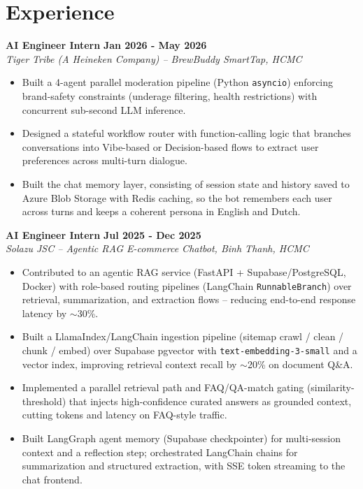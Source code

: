 \documentclass[a4paper,10pt]{article}
\begin{document}
\section{Experience}

\textbf{AI Engineer Intern} \hfill \textbf{Jan 2026 - May 2026} \\
\textit{Tiger Tribe (A Heineken Company) -- BrewBuddy SmartTap, HCMC} \\
\vspace{-0.3em}
\begin{itemize}[leftmargin=1.2em, itemsep=0.05em, parsep=0pt, topsep=0pt]
    \item Built a 4-agent parallel moderation pipeline (Python \texttt{asyncio}) enforcing brand-safety constraints (underage filtering, health restrictions) with concurrent sub-second LLM inference.
    \item Designed a stateful workflow router with function-calling logic that branches conversations into Vibe-based or Decision-based flows to extract user preferences across multi-turn dialogue.
    \item Built the chat memory layer, consisting of session state and history saved to Azure Blob Storage with Redis caching, so the bot remembers each user across turns and keeps a coherent persona in English and Dutch.
\end{itemize}

\vspace{0.3em}
\noindent\textbf{AI Engineer Intern} \hfill \textbf{Jul 2025 - Dec 2025} \\
\textit{Solazu JSC -- Agentic RAG E-commerce Chatbot, Binh Thanh, HCMC} \\
\vspace{-0.3em}
\begin{itemize}[leftmargin=1.2em, itemsep=0.05em, parsep=0pt, topsep=0pt]
    \item Contributed to an agentic RAG service (FastAPI + Supabase/PostgreSQL, Docker) with role-based routing pipelines (LangChain \texttt{RunnableBranch}) over retrieval, summarization, and extraction flows -- reducing end-to-end response latency by $\sim$30\%.
    \item Built a LlamaIndex/LangChain ingestion pipeline (sitemap crawl / clean / chunk / embed) over Supabase pgvector with \texttt{text-embedding-3-small} and a vector index, improving retrieval context recall by $\sim$20\% on document Q\&A.
    \item Implemented a parallel retrieval path and FAQ/QA-match gating (similarity-threshold) that injects high-confidence curated answers as grounded context, cutting tokens and latency on FAQ-style traffic.
    \item Built LangGraph agent memory (Supabase checkpointer) for multi-session context and a reflection step; orchestrated LangChain chains for summarization and structured extraction, with SSE token streaming to the chat frontend.
\end{itemize}
\end{document}
